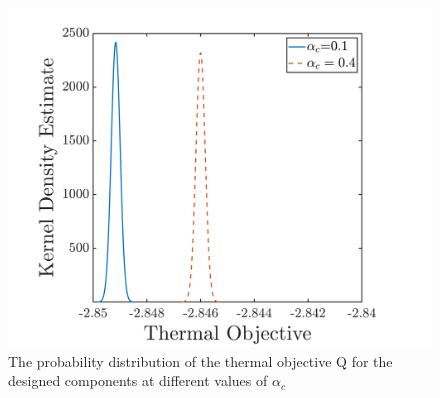 \documentclass[pdf-a,balance,colorlinks,upint,subscriptcorrection,varvw,mathalfa=cal=boondoxo, spanish,french,vietnamese,russian,greek]{asmeconf}
\begin{document}
\begin{figure}[h]
\centering
\includegraphics[width=0.8\linewidth]{Figures/Thermal_objective.png} 
\caption{The probability distribution of the thermal objective Q for the designed components at different values of $\alpha_{c}$}\label{fig:chance_thermal}
\end{figure}
\end{document}
